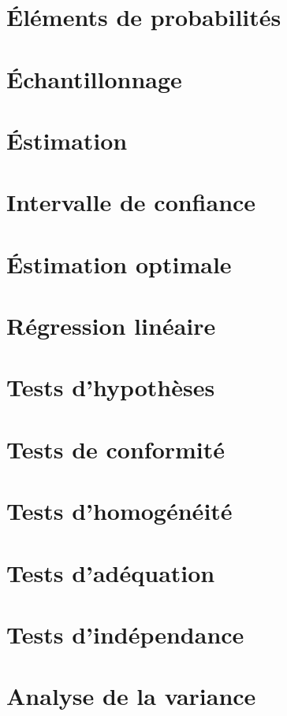 \section{Éléments de probabilités}


\section{Échantillonnage}


\section{Éstimation}


\section{Intervalle de confiance}


\section{Éstimation optimale}


\section{Régression linéaire}


\section{Tests d'hypothèses}


\section{Tests de conformité}


\section{Tests d'homogénéité}


\section{Tests d'adéquation}


\section{Tests d'indépendance}


\section{Analyse de la variance}

